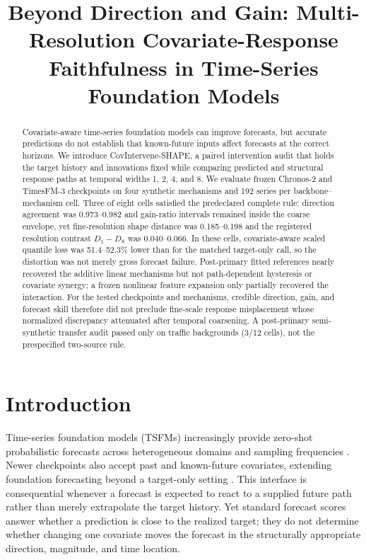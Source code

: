 \documentclass[conference]{IEEEtran}
\title{Beyond Direction and Gain: Multi-Resolution Covariate-Response
Faithfulness in Time-Series Foundation Models}
\author{\IEEEauthorblockN{Anonymous Authors}}
\begin{document}
\maketitle

\begin{abstract}
Covariate-aware time-series foundation models can improve forecasts, but accurate
predictions do not establish that known-future inputs affect forecasts at the correct
horizons. We introduce CovIntervene-SHAPE, a paired intervention audit that holds the
target history and innovations fixed while comparing predicted and structural response
paths at temporal widths 1, 2, 4, and 8. We evaluate frozen Chronos-2 and TimesFM-3
checkpoints on four synthetic mechanisms and 192 series per backbone--mechanism cell.
Three of eight cells satisfied the predeclared complete rule: direction agreement was
0.973--0.982 and gain-ratio intervals remained inside the coarse envelope, yet
fine-resolution shape distance was 0.185--0.198 and the registered resolution
contrast $D_1-D_8$ was 0.040--0.066. In these cells, covariate-aware scaled
quantile loss was 51.4--52.3\%
lower than for the matched target-only call, so the distortion was not merely gross
forecast failure. Post-primary fitted references nearly recovered the additive linear
mechanisms but not path-dependent hysteresis or covariate synergy; a frozen nonlinear
feature expansion only partially recovered the interaction. For the tested checkpoints
and mechanisms, credible direction, gain, and forecast skill therefore did not preclude
fine-scale response misplacement whose normalized discrepancy attenuated after temporal
coarsening. A post-primary semi-synthetic transfer audit passed only on traffic
backgrounds (3/12 cells), not the prespecified two-source rule.
\end{abstract}

\section{Introduction}
Time-series foundation models (TSFMs) increasingly provide zero-shot probabilistic
forecasts across heterogeneous domains and sampling frequencies
\cite{ansari2024chronos,das2024timesfm}. Newer checkpoints also accept past and
known-future covariates, extending foundation forecasting beyond a target-only setting
\cite{ansari2025chronos2,jain2026timesfm3}. This interface is consequential whenever a
forecast is expected to react to a supplied future path rather than merely extrapolate
the target history. Yet standard forecast scores answer whether a prediction is close
to the realized target; they do not determine whether changing one covariate moves the
forecast in the structurally appropriate direction, magnitude, and time location.
\end{document}
